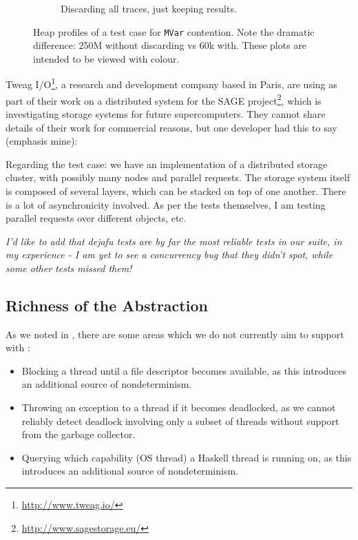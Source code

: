 \begin{figure}
\begin{subfigure}{0.49\textwidth}
    \caption{Discarding all traces, just keeping results.}
  \end{subfigure}
  \caption[Heap profiles of a test case for \texttt{MVar} contention.]{Heap profiles of a test case for \texttt{MVar} contention.  Note the dramatic difference: 250M without discarding vs 60k with.  These plots are intended to be viewed with colour.}\label{fig:discard}
\end{figure}

Tweag I/O\footnote{\url{http://www.tweag.io/}}, a research and
development company based in Paris, are using \dejafu{} as part of
their work on a distributed system for the SAGE
project\footnote{\url{http://www.sagestorage.eu/}}, which is
investigating storage systems for future supercomputers.  They cannot
share details of their work for commercial reasons, but one developer
had this to say (emphasis mine):

\begin{displayquote}
  Regarding the test case: we have an implementation of a distributed
  storage cluster, with possibly many nodes and parallel requests.
  The storage system itself is composed of several layers, which can
  be stacked on top of one another.  There is a lot of asynchronicity
  involved.  As per the tests themselves, I am testing parallel
  requests over different objects, etc.

  \emph{I'd like to add that dejafu tests are by far the most reliable
    tests in our suite, in my experience - I am yet to see a
    concurrency bug that they didn't spot, while some other tests
    missed them!} \parencite{tweag2017}
\end{displayquote}

\subsection{Richness of the Abstraction}

As we noted in , there are some areas
which we do not currently aim to support with \dejafu{}:

\begin{itemize}
\item Blocking a thread until a file descriptor becomes available, as
  this introduces an additional source of nondeterminism.
\item Throwing an exception to a thread if it becomes deadlocked, as
  we cannot reliably detect deadlock involving only a subset of
  threads without support from the garbage collector.
\item Querying which capability (OS thread) a Haskell thread is
  running on, as this introduces an additional source of
  nondeterminism.
\end{itemize}

